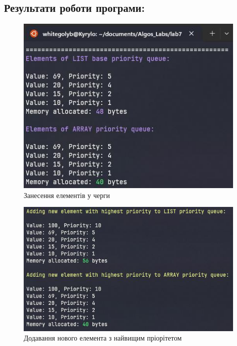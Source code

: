 \clearpage
\subsection{Результати роботи програми:}

\begin{figure}[h!]
    \centering
    \includegraphics[width=15cm]{reports/algos/lab7/assets/1.jpeg}
    \caption{Занесення елементів у черги}
\end{figure}


\begin{figure}[h!]
  \centering
  \includegraphics[width=15cm]{reports/algos/lab7/assets/2.jpeg}
  \caption{Додавання нового елемента з найвищим пріорітетом}
\end{figure}

